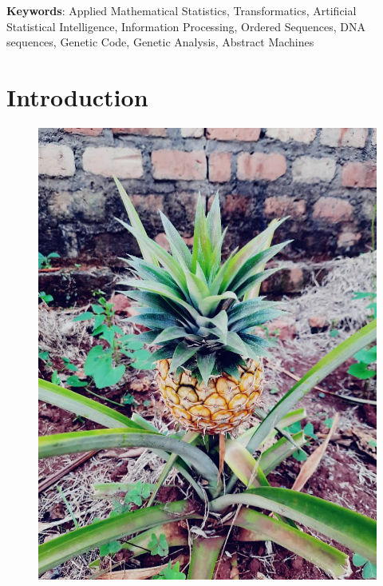 \documentclass[a4paper, 18pt]{book} %
\begin{document}
     \newline\newline
     \textbf{Keywords}: Applied Mathematical Statistics, Transformatics, Artificial Statistical Intelligence, Information Processing, Ordered Sequences, DNA sequences, Genetic Code, Genetic Analysis, Abstract Machines

\newpage

\chapter{Introduction}
\label{SEC1}


\begin{figure}[H]
  \begin{center}
   \includegraphics[height=0.6\textheight,]{resources/images/the_pineapple.jpg}\\

\end{center}
\end{figure}
\end{document}
